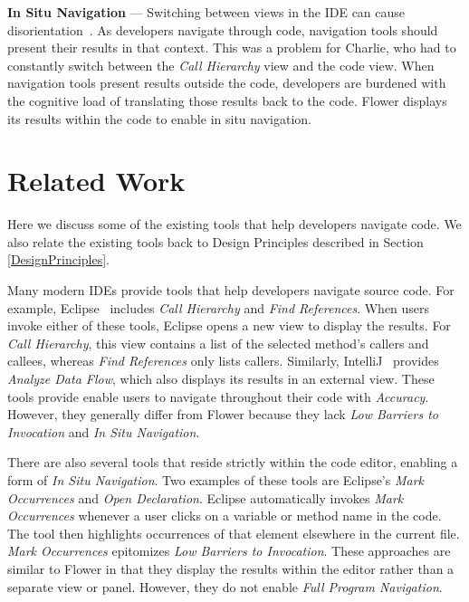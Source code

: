 \documentclass[conference]{IEEEtran}
\begin{document}
\vspace{1em} 
\noindent\textbf{In Situ Navigation}  ---
Switching between views in the IDE can cause disorientation~\cite{deAlwis2006disorient}. 
As developers navigate through code, navigation tools should present their results in that context. 
This was a problem for Charlie, who had to constantly switch between the \emph{Call Hierarchy} view and the code view.
When navigation tools present results outside the code, developers are burdened with the cognitive load of translating those results back to the code.
Flower displays its results within the code to enable in situ navigation.

\section{Related Work}
Here we discuss some of the existing tools that help developers navigate code. We also relate the existing tools back to Design Principles described in Section \ref{DesignPrinciples}.

Many modern IDEs provide tools that help developers navigate source code. 
For example, Eclipse~\cite{Eclipse} includes \emph{Call Hierarchy} and \emph{Find References}. 
When users invoke either of these tools, Eclipse opens a new view to display the results.
For \emph{Call Hierarchy}, this view contains a list of the selected method's callers and callees, whereas \emph{Find References} only lists callers.
Similarly, IntelliJ~\cite{IntelliJ} provides \emph{Analyze Data Flow}, which also displays its results in an external view.
These tools provide enable users to navigate throughout their code with \textit{Accuracy}. 
However, they generally differ from Flower because they lack \textit{Low Barriers to Invocation} and \textit{In Situ Navigation}.

There are also several tools that reside strictly within the code editor, enabling a form of \textit{In Situ Navigation}.
Two examples of these tools are Eclipse's \emph{Mark Occurrences} and \emph{Open Declaration}. 
Eclipse automatically invokes \emph{Mark Occurrences} whenever a user clicks on a variable or method name in the code.
The tool then highlights occurrences of that element elsewhere in the current file.
\emph{Mark Occurrences} epitomizes \textit{Low Barriers to Invocation}.
These approaches are similar to Flower in that they display the results within the editor rather than a separate view or panel.
However, they do not enable \textit{Full Program Navigation}.
\end{document}
